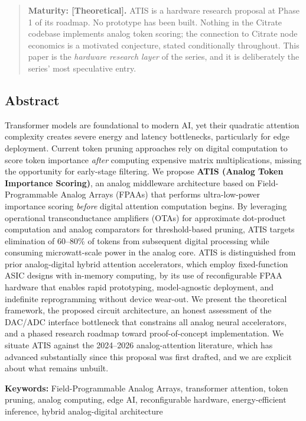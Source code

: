 \begin{quote}
\textbf{Maturity: {[}Theoretical{]}.} ATIS is a hardware research
proposal at Phase 1 of its roadmap. No prototype has been built. Nothing
in the Citrate codebase implements analog token scoring; the connection
to Citrate node economics is a motivated conjecture, stated
conditionally throughout. This paper is the \emph{hardware research
layer} of the series, and it is deliberately the series' most
speculative entry.
\end{quote}

\subsection{Abstract}\label{abstract}

Transformer models are foundational to modern AI, yet their quadratic
attention complexity creates severe energy and latency bottlenecks,
particularly for edge deployment. Current token pruning approaches rely
on digital computation to score token importance \emph{after} computing
expensive matrix multiplications, missing the opportunity for
early-stage filtering. We propose \textbf{ATIS (Analog Token Importance
Scoring)}, an analog middleware architecture based on Field-Programmable
Analog Arrays (FPAAs) that performs ultra-low-power importance scoring
\emph{before} digital attention computation begins. By leveraging
operational transconductance amplifiers (OTAs) for approximate
dot-product computation and analog comparators for threshold-based
pruning, ATIS targets elimination of 60--80\% of tokens from subsequent
digital processing while consuming microwatt-scale power in the analog
core. ATIS is distinguished from prior analog-digital hybrid attention
accelerators, which employ fixed-function ASIC designs with in-memory
computing, by its use of reconfigurable FPAA hardware that enables rapid
prototyping, model-agnostic deployment, and indefinite reprogramming
without device wear-out. We present the theoretical framework, the
proposed circuit architecture, an honest assessment of the DAC/ADC
interface bottleneck that constrains all analog neural accelerators, and
a phased research roadmap toward proof-of-concept implementation. We
situate ATIS against the 2024--2026 analog-attention literature, which
has advanced substantially since this proposal was first drafted, and we
are explicit about what remains unbuilt.

\textbf{Keywords:} Field-Programmable Analog Arrays, transformer
attention, token pruning, analog computing, edge AI, reconfigurable
hardware, energy-efficient inference, hybrid analog-digital architecture

